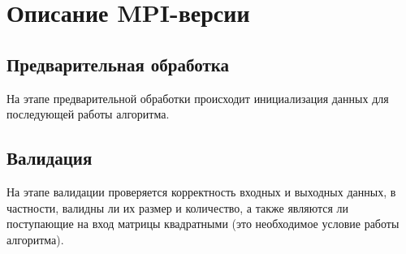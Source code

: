 \documentclass[a4paper,12pt]{article}
\begin{document}
\section{Описание MPI-версии}
\subsection{Предварительная обработка}
На этапе предварительной обработки происходит инициализация данных для последующей работы алгоритма.

\subsection{Валидация}
На этапе валидации проверяется корректность входных и выходных данных, в частности, валидны ли их размер и количество, а также являются ли поступающие на вход матрицы квадратными (это необходимое условие работы алгоритма).
\end{document}
